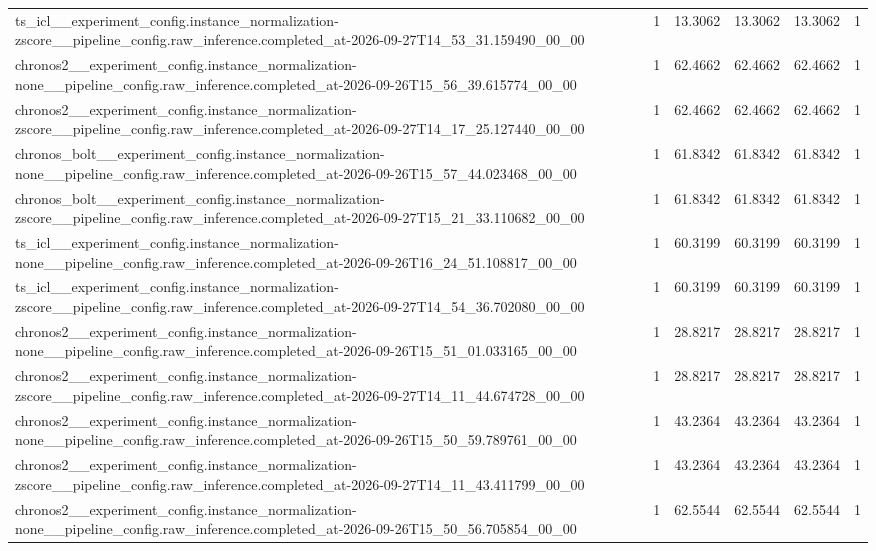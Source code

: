 \begin{tabular}{llllll}
ts\_icl\_\_experiment\_config.instance\_normalization-zscore\_\_pipeline\_config.raw\_inference.completed\_at-2026-09-27T14\_53\_31.159490\_00\_00 & 1 & 13.3062 & 13.3062 & 13.3062 & 1 \\
chronos2\_\_experiment\_config.instance\_normalization-none\_\_pipeline\_config.raw\_inference.completed\_at-2026-09-26T15\_56\_39.615774\_00\_00 & 1 & 62.4662 & 62.4662 & 62.4662 & 1 \\
chronos2\_\_experiment\_config.instance\_normalization-zscore\_\_pipeline\_config.raw\_inference.completed\_at-2026-09-27T14\_17\_25.127440\_00\_00 & 1 & 62.4662 & 62.4662 & 62.4662 & 1 \\
chronos\_bolt\_\_experiment\_config.instance\_normalization-none\_\_pipeline\_config.raw\_inference.completed\_at-2026-09-26T15\_57\_44.023468\_00\_00 & 1 & 61.8342 & 61.8342 & 61.8342 & 1 \\
chronos\_bolt\_\_experiment\_config.instance\_normalization-zscore\_\_pipeline\_config.raw\_inference.completed\_at-2026-09-27T15\_21\_33.110682\_00\_00 & 1 & 61.8342 & 61.8342 & 61.8342 & 1 \\
ts\_icl\_\_experiment\_config.instance\_normalization-none\_\_pipeline\_config.raw\_inference.completed\_at-2026-09-26T16\_24\_51.108817\_00\_00 & 1 & 60.3199 & 60.3199 & 60.3199 & 1 \\
ts\_icl\_\_experiment\_config.instance\_normalization-zscore\_\_pipeline\_config.raw\_inference.completed\_at-2026-09-27T14\_54\_36.702080\_00\_00 & 1 & 60.3199 & 60.3199 & 60.3199 & 1 \\
chronos2\_\_experiment\_config.instance\_normalization-none\_\_pipeline\_config.raw\_inference.completed\_at-2026-09-26T15\_51\_01.033165\_00\_00 & 1 & 28.8217 & 28.8217 & 28.8217 & 1 \\
chronos2\_\_experiment\_config.instance\_normalization-zscore\_\_pipeline\_config.raw\_inference.completed\_at-2026-09-27T14\_11\_44.674728\_00\_00 & 1 & 28.8217 & 28.8217 & 28.8217 & 1 \\
chronos2\_\_experiment\_config.instance\_normalization-none\_\_pipeline\_config.raw\_inference.completed\_at-2026-09-26T15\_50\_59.789761\_00\_00 & 1 & 43.2364 & 43.2364 & 43.2364 & 1 \\
chronos2\_\_experiment\_config.instance\_normalization-zscore\_\_pipeline\_config.raw\_inference.completed\_at-2026-09-27T14\_11\_43.411799\_00\_00 & 1 & 43.2364 & 43.2364 & 43.2364 & 1 \\
chronos2\_\_experiment\_config.instance\_normalization-none\_\_pipeline\_config.raw\_inference.completed\_at-2026-09-26T15\_50\_56.705854\_00\_00 & 1 & 62.5544 & 62.5544 & 62.5544 & 1 \\

\end{tabular}
